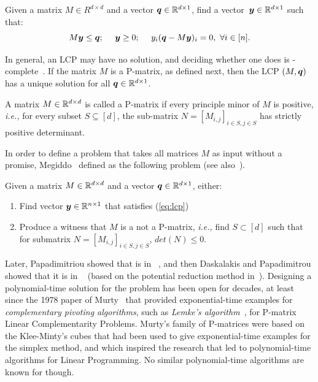 \begin{definition}[LCP]
\label{def:lcp}
Given a matrix $M \in R^{d \times d}$ and a vector $\mbox{\boldmath $q$}\in \mathbb{R}^{d\times 1}$,
find a vector~{$\mbox{\boldmath $y$}\in \mathbb{R}^{d \times 1}$} such that:
\begin{equation}\label{eq:lcp}
M\mbox{\boldmath $y$}\le \mbox{\boldmath $q$};\ \ \ \ \mbox{\boldmath $y$}\ge 0;\ \ \ \ y_i(\mbox{\boldmath $q$} - M\mbox{\boldmath $y$})_i =0,\ \forall i \in [n].
\end{equation}
\end{definition}
%
In general, an LCP may have no solution, and deciding whether one does is
\NP-complete~\cite{chung1989np}. If the matrix $M$ is a P-matrix, as defined
next, then the LCP $(M,\mbox{\boldmath $q$})$ has a unique solution for all $\mbox{\boldmath $q$}\in \mathbb{R}^{d\times
1}$.
%
\begin{definition}[P-matrix]
\label{def:Pmatrix}
A matrix $M \in \mathbb{R}^{d \times d}$ is called a P-matrix if every principle
minor of $M$ is positive, {\em i.e.,} for every subset $S\subseteq[d]$, the
sub-matrix $N=[M_{i,j}]_{i\in S, j\in S}$ has strictly positive determinant. 
\end{definition}
%
In order to define a problem that takes all matrices $M$ as input without 
a promise, Megiddo~\cite{megiddo1988note} defined \PLCP as the following problem
(see also~\cite{megiddo1991total}).
%
\begin{definition}[\PLCP] \label{def:plcp} Given a matrix $M\in \mathbb{R}^{d\times
d}$ and a vector $\mbox{\boldmath $q$}\in \mathbb{R}^{d\times 1}$, either:
\begin{enumerate}[label=(Q\arabic*)] \item Find vector $\mbox{\boldmath $y$} \in \mathbb{R}^{n
			\times 1}$ that satisfies (\ref{eq:lcp}) \item Produce a witness
that $M$ is a not a P-matrix, {\em i.e.,} find $S\subset [d]$ such that for
submatrix $N=[M_{i,j}]_{i\in S, j\in S}$, $det(N)\le 0$.  \end{enumerate}
\end{definition}
%
Later, Papadimitriou showed that \PLCP is in
\PPAD~\cite{papadimitriou1994complexity}, and then Daskalakis and Papadimitrou
showed that it is in \CLS~\cite{daskalakis2011continuous} (based on the
potential reduction method in~\cite{kojima1992interior}).  Designing a
polynomial-time solution for the \PLCP problem has been open for decades, at
least since the 1978 paper of Murty~\cite{murty1978computational} that provided
exponential-time examples for \emph{complementary pivoting algorithms}, such as 
\emph{Lemke's algorithm}~\cite{lemke1965bimatrix}, for
P-matrix Linear Complementarity Problems. Murty's family of P-matrices were
based on the Klee-Minty's cubes that had been used to give exponential-time
examples for the simplex method, and which inspired the research that led to
polynomial-time algorithms for Linear Programming. No similar polynomial-time
algorithms are known for \PLCP though.

